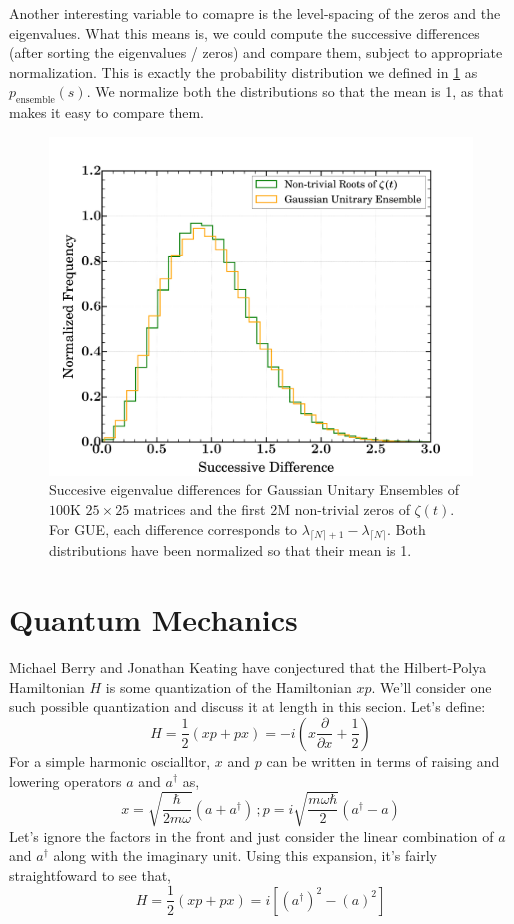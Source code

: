 \documentclass{amsproc}
\newcommand{\be}{\begin{equation}}
\newcommand{\ee}{\end{equation}}
\theoremstyle{definition}
\theoremstyle{remark}
\numberwithin{equation}{section}
\begin{document}
Another interesting variable to comapre is the level-spacing of the zeros and the eigenvalues. What this means is, we could compute the successive differences (after sorting the eigenvalues / zeros) and compare them, subject to appropriate normalization. This is exactly the probability distribution we defined in \ref{} as $p_{\mathrm{ensemble}}(s)$. We normalize both the distributions so that the mean is 1, as that makes it easy to compare them. 

\begin{figure}
\includegraphics[width=\columnwidth]{figures/GUE_eigenvalues_and_zeros_differences.pdf}
\caption{Succesive eigenvalue differences for Gaussian Unitary Ensembles of $100\mathrm{K}$ $25 \times 25$ matrices and the first 2M non-trivial zeros of $\zeta(t)$. For GUE, each difference corresponds to $\lambda_{\lceil N \rceil + 1} - \lambda_{ \lceil N \rceil}$. Both distributions have been normalized so that their mean is 1. }
\label{fig:random_matrices_eigenvalues_differences}
\end{figure}

\section{Quantum Mechanics}
Michael Berry and Jonathan Keating have conjectured that the Hilbert-Polya Hamiltonian $H$ is some quantization of the Hamiltonian $xp$. We'll consider one such possible quantization and discuss it at length in this secion. Let's define:
\be
H = \frac{1}{2} \left( x p + p x \right) = -i \left( x\frac{ \partial}{\partial x} + \frac{1}{2} \right)
\ee
For a simple harmonic oscialltor, $x$ and $p$ can be written in terms of raising and lowering operators $a$ and $a^{\dagger}$ as,
\be
x = \sqrt{\frac{ \hbar }{ 2 m \omega }} (a + a^{\dagger} )\,;
p = i \sqrt{ \frac{m \omega \hbar }{ 2 } } ( a^{\dagger} - a )
\ee
Let's ignore the factors in the front and just consider the linear combination of $a$ and $a^{\dagger}$ along with the imaginary unit. Using this expansion, it's fairly straightfoward to see that,
\be
H = \frac{1}{2} \left( xp + px \right) = i \left[ ( a^{\dagger} )^2 - (a)^2 \right]
\ee
\end{document}
